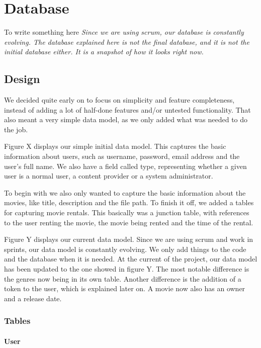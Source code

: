 \chapter{Database}
\label{database}
To write something here
\emph{Since we are using scrum, our database is constantly evolving. The database explained here is not the final database, and it is not the initial database either. It is a snapshot of how it looks right now.}

\section{Design}
\label{database_design}
We decided quite early on to focus on simplicity and feature completeness, instead of adding a lot of half-done features and/or untested functionality. That also meant a very simple data model, as we only added what was needed to do the job.


Figure X displays our simple initial data model. This captures the basic information about users, such as username, password, email address and the user's full name. We also have a field called type, representing whether a given user is a normal user, a content provider or a system administrator.

To begin with we also only wanted to capture the basic information about the movies, like title, description and the file path. To finish it off, we added a tables for capturing movie rentals. This basically was a junction table, with references to the user renting the movie, the movie being rented and the time of the rental.


Figure Y displays our current data model. Since we are using scrum and work in sprints, our data model is constantly evolving. We only add things to the code and the database when it is needed. At the current of the project, our data model has been updated to the one showed in figure Y. The most notable difference is the genres now being in its own table. Another difference is the addition of a token to the user, which is explained later on. A movie now also has an owner and a release date.

\subsection{Tables}
\label{database_design_tables}

\subsubsection{User}
\label{database_design_tables_user}

